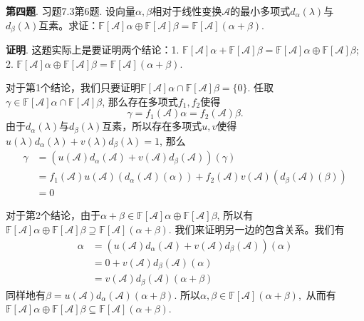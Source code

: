 {\newpageorvspace


{\bf 第四题}. 习题7.3第6题. 设向量$\alpha, \beta$相对于线性变换$\mathscr{A}$的最小多项式$d_{\alpha}(\lambda)$与$d_{\beta}(\lambda)$互素。求证：$\mathbb{F}[\mathscr{A}]\alpha \oplus \mathbb{F}[\mathscr{A}]\beta = \mathbb{F}[\mathscr{A}](\alpha + \beta)$.

\newpageorvspace

{\bf 证明}. 这题实际上是要证明两个结论：1. $\mathbb{F}[\mathscr{A}]\alpha + \mathbb{F}[\mathscr{A}]\beta = \mathbb{F}[\mathscr{A}]\alpha \oplus \mathbb{F}[\mathscr{A}]\beta$; 2. $\mathbb{F}[\mathscr{A}]\alpha \oplus \mathbb{F}[\mathscr{A}]\beta = \mathbb{F}[\mathscr{A}](\alpha + \beta)$.

对于第1个结论，我们只要证明$\mathbb{F}[\mathscr{A}]\alpha \cap \mathbb{F}[\mathscr{A}]\beta = \{0\}$. 任取$\gamma \in \mathbb{F}[\mathscr{A}]\alpha \cap \mathbb{F}[\mathscr{A}]\beta$, 那么存在多项式$f_1, f_2$使得
$$\gamma = f_1(\mathscr{A})\alpha = f_2(\mathscr{A})\beta.$$
由于$d_{\alpha}(\lambda)$与$d_{\beta}(\lambda)$互素，所以存在多项式$u,v$使得$u(\lambda)d_{\alpha}(\lambda) + v(\lambda)d_{\beta}(\lambda) = 1$, 那么
\begin{align*}
\gamma & = (u(\mathscr{A})d_{\alpha}(\mathscr{A}) + v(\mathscr{A})d_{\beta}(\mathscr{A})) (\gamma) \\
& = f_1(\mathscr{A})u(\mathscr{A})(d_{\alpha}(\mathscr{A})(\alpha)) + f_2(\mathscr{A})v(\mathscr{A})(d_{\beta}(\mathscr{A})(\beta)) \\
& = 0
\end{align*}

对于第2个结论，由于$\alpha + \beta \in \mathbb{F}[\mathscr{A}]\alpha \oplus \mathbb{F}[\mathscr{A}]\beta$, 所以有$\mathbb{F}[\mathscr{A}]\alpha \oplus \mathbb{F}[\mathscr{A}]\beta \supseteq \mathbb{F}[\mathscr{A}](\alpha + \beta)$. 我们来证明另一边的包含关系。我们有
\begin{align*}
\alpha & = (u(\mathscr{A})d_{\alpha}(\mathscr{A}) + v(\mathscr{A})d_{\beta}(\mathscr{A})) (\alpha) \\
& = 0 + v(\mathscr{A})d_{\beta}(\mathscr{A}) (\alpha) \\
& = v(\mathscr{A})d_{\beta}(\mathscr{A}) (\alpha + \beta)
\end{align*}
同样地有$\beta = u(\mathscr{A})d_{\alpha}(\mathscr{A}) (\alpha + \beta)$. 所以$\alpha, \beta \in \mathbb{F}[\mathscr{A}](\alpha + \beta),$ 从而有$\mathbb{F}[\mathscr{A}]\alpha \oplus \mathbb{F}[\mathscr{A}]\beta \subseteq \mathbb{F}[\mathscr{A}](\alpha + \beta)$.


}
